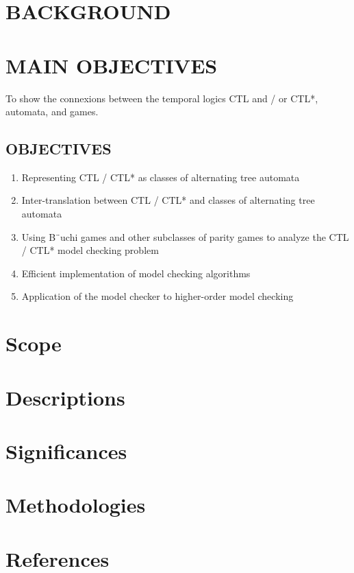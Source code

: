 \documentclass[12pt,letterpaper]{article}
\begin{document}
\section{BACKGROUND}

\section{MAIN OBJECTIVES}
 To show the connexions between the temporal logics CTL and / or CTL*, automata, and games.
\subsection{OBJECTIVES}
  \begin{enumerate}
    \item Representing CTL / CTL* as classes of alternating tree automata\\
    \item Inter-translation between CTL / CTL* and classes of alternating tree automata\\
    \item Using B¨uchi games and other subclasses of parity games to analyze the CTL / CTL* model checking problem\\
    \item Efficient implementation of model checking algorithms\\
    \item Application of the model checker to higher-order model checking\\
  \end{enumerate}
\section{Scope}
\section{Descriptions}
\section{Significances}
\section{Methodologies}
\section{References}
\end{document}

